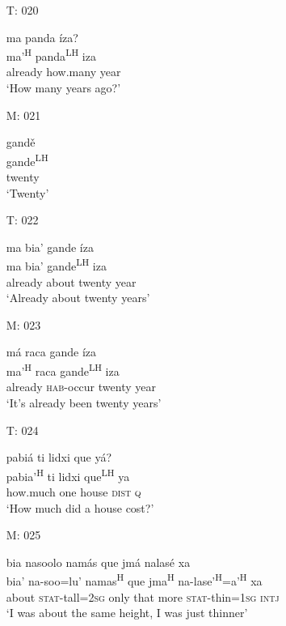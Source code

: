 \begin{itemize}
\item[T: 020]
    
ma panda \'{i}za?\\
ma'\textsuperscript{H} panda\textsuperscript{LH} iza\\
already how.many year\\
\glt `How many years ago?'
 

\item[M: 021]
   
\glll gand\v{e}\\
gande\textsuperscript{LH} \\
twenty\\
\glt `Twenty'
 

\item[T: 022]
   
\glll ma bia' gande \'{i}za \\
ma bia' gande\textsuperscript{LH}  iza \\
already about twenty year\\
\glt `Already about twenty years'
 

\item[M: 023]
   
\glll m\'{a} raca gande \'{i}za\\
ma'\textsuperscript{H} raca gande\textsuperscript{LH} iza\\
already \textsc{hab}-occur twenty year\\
\glt `It's already been twenty years'
 


\item[T: 024]
   
pabi\'{a} ti lidxi que y\'{a}?\\
pabia'\textsuperscript{H}  ti lidxi que\textsuperscript{LH}  ya\\
how.much one house \textsc{dist} \textsc{q}\\
\glt `How much did a house cost?'
 

\item[M: 025]
    
\glll bia nasoolo nam\'{a}s que jm\'{a} nalas\'{e} xa\\
bia' na-soo=lu' namas\textsuperscript{H} que jma\textsuperscript{H} na-lase'\textsuperscript{H}=a'\textsuperscript{H} xa\\ 
about \textsc{stat}-tall=\textsc{2sg} only that more \textsc{stat}-thin=\textsc{1sg} \textsc{intj}\\
\glt `I was about the same height, I was just thinner'
 


\end{itemize}
